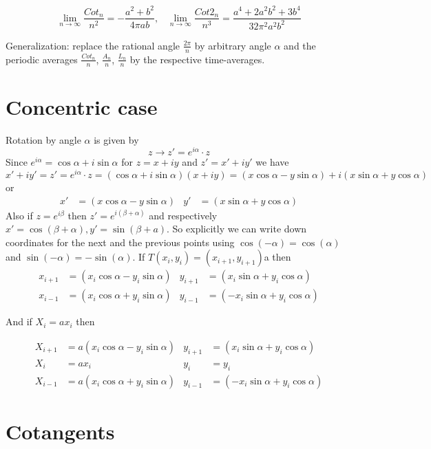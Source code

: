 \documentclass[12pt]{article}
\numberwithin{equation}{section}
\begin{document}
\[ \lim_{n\to\infty}\frac{Cot_n}{n^2}=-\frac{ a^2+b^2}{4\pi ab},\;\;\;\lim_{n\to\infty}\frac{Cot2_n}{n^3}= \frac{ a^4+2 a^2 b^2 +3 b^4}{ 32\pi^2 a^2b^2   } \]


Generalization: 
replace the rational angle $\frac{2π}{n}$ 
by arbitrary angle $α$ 
and the periodic averages 
$\frac{Cot_n}{n}$, $\frac{A_n}{n}$, $\frac{L_n}{n}$ 
by the respective time-averages.


\section{Concentric case}
\label{sec:concentric}

Rotation by angle $α$ is given by
\[ z\to z' = e^{i α} \cdot z \]
Since $e^{i α} = \cos α + i \sin α$ for $z = x + i y$ and $z'=x'+iy'$ we have
\[ x'+iy' = z' = e^{i α} \cdot z = (\cos α + i \sin α) (x + i y) = (x \cos α - y \sin α) + i (x \sin α + y \cos α) \] 
or
\begin{align*} x' &= (x \cos α - y \sin α)    &     y' &= (x \sin α + y \cos α) \end{align*}
Also if $z = e^{i β}$ then $z' = e^{i (β+α)}$ and respectively $x'=\cos(β+α), y'=\sin(β+a)$.
So explicitly we can write down coordinates for the next and the previous points using $\cos(-α)=\cos(α)$ and $\sin(-α)=-\sin(α)$.
If $T (x_i,y_i) = (x_{i+1},y_{i+1})$a then
\begin{align} 
x_{i+1} &= (x_i \cos α - y_i \sin α)    &     y_{i+1} &= (x_i \sin α + y_i \cos α)  \\
x_{i-1} &= (x_i \cos α + y_i \sin α)    &     y_{i-1} &= (-x_i \sin α + y_i \cos α)  
\end{align}

And if $X_i = a x_i$ then

\begin{align} \label{scaled-dynamics} 
X_{i+1} &= a(x_i \cos α - y_i \sin α)   &    y_{i+1} &= ( x_i \sin α + y_i \cos α)  \\
X_i     &= a x_i                        &    y_i     &=                y_i          \\
X_{i-1} &= a(x_i \cos α + y_i \sin α)   &    y_{i-1} &= (-x_i \sin α + y_i \cos α)  
\end{align}

\section{Cotangents}
\label{sec:cotangent}
\end{document}
